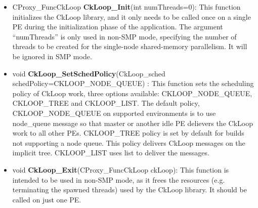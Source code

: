 \begin{itemize}
\item CProxy\_FuncCkLoop \textbf{CkLoop\_Init}(int
numThreads=0): This function initializes the CkLoop library, and it only needs
to be called once on a single PE during the initialization phase of the
application.  The argument ``numThreads'' is only used in non-SMP mode,
specifying the number of threads to be created for the single-node shared-memory
parallelism. It will be ignored in SMP mode.

\item void \textbf{CkLoop\_SetSchedPolicy}(CkLoop\_sched schedPolicy=CKLOOP\_NODE\_QUEUE)
: This function sets the scheduling policy of CkLoop work, three options
available: CKLOOP\_NODE\_QUEUE, CKLOOP\_TREE and CKLOOP\_LIST. The default policy, CKLOOP\_NODE\_QUEUE
on supported environments is to use node\_queue message so that master or another idle PE
delievers the CkLoop work to all other PEs.
CKLOOP\_TREE policy is set by default for builds not supporting a node queue. This policy delivers
CkLoop messages on the implicit tree. CKLOOP\_LIST uses list to deliver the messages.

\item void \textbf{CkLoop\_Exit}(CProxy\_FuncCkLoop ckLoop): This function is
intended to be used in non-SMP mode, as it frees the resources
(e.g. terminating the spawned threads) used by the CkLoop library. It should
be called on just one PE.


\end{itemize}
